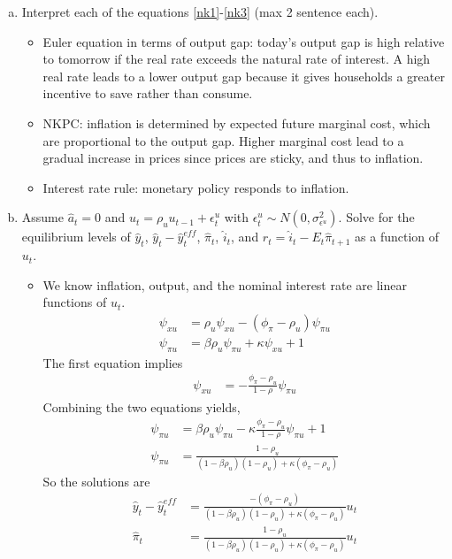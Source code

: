 \documentclass{article}
\newcommand{\1}{\mathbf{1}}
\begin{document}
\begin{enumerate}[(a)]
\item Interpret each of the equations \eqref{nk1}-\eqref{nk3} (max 2 sentence each).
	\begin{itemize}
		\item Euler equation in terms of output gap: today's output gap is high relative to tomorrow if the real rate exceeds the natural rate of interest. A high real rate leads to a lower output gap because it gives households a greater incentive to save rather than consume.
		\item NKPC: inflation is determined by expected future marginal cost, which are proportional to the output gap. Higher marginal cost lead to a gradual increase in prices since prices are sticky, and thus to inflation.
		\item Interest rate rule: monetary policy responds to inflation.
	\end{itemize}	
\item Assume $\hat{a}_{t}=0$ and $u_{t}=\rho_u u_{t-1}+\epsilon_t^u$ with $\epsilon_t^u\sim N(0,\sigma^2_{\epsilon^u})$. Solve for the equilibrium levels of $\hat{y}_t$, $\hat{y}_t-\hat{y}_t^{eff}$, $\hat{\pi}_t$, $\hat{i}_t$, and $\hat{r}_{t}=\hat{i}_t-E_t\hat{\pi}_{t+1}$ as a function of $u_t$.
\begin{itemize}
	\item We know inflation, output, and the nominal interest rate are linear functions of $u_t$.
\begin{align*}
	\psi_{xu} &= \rho_u \psi_{xu} - (\phi_\pi-\rho_u)\psi_{\pi u}\\
	\psi_{\pi u} &= \beta\rho_u \psi_{\pi u} + \kappa \psi_{x u} + 1
\end{align*}
The first equation implies
\begin{align*}
	\psi_{xu} &= -\frac{\phi_\pi-\rho_u}{1-\rho}\psi_{\pi u}
	\end{align*}
	Combining the two equations yields,
	\begin{align*}
	\psi_{\pi u} &= \beta\rho_u \psi_{\pi u} - \kappa \frac{\phi_\pi-\rho_u}{1-\rho}\psi_{\pi u} + 1 \\
	\psi_{\pi u} &=\frac{1-\rho_u}{(1-\beta\rho_u)(1-\rho_u) +\kappa(\phi_\pi-\rho_u)}
\end{align*}
So the solutions are
\begin{align*}
	\hat{y}_{t}-\hat{y}_{t}^{eff}&= \frac{-(\phi_\pi-\rho_u)}{(1-\beta\rho_u)(1-\rho_u) +\kappa(\phi_\pi-\rho_u)}u_t \\
	\hat{\pi}_t&= \frac{1-\rho_u}{(1-\beta\rho_u)(1-\rho_u) +\kappa(\phi_\pi-\rho_u)}u_t \\

\end{align*}
\end{itemize}
\end{enumerate}
\end{document}
